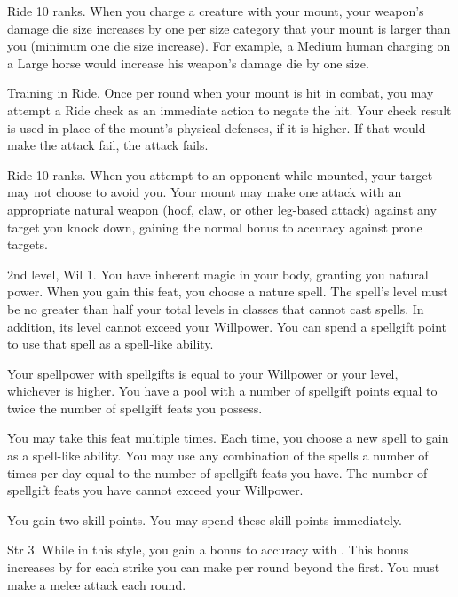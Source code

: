\featpre Ride 10 ranks.
\featben When you charge a creature with your mount, your weapon's damage die size increases by one per size category that your mount is larger than you (minimum one die size increase).
For example, a Medium human charging on a Large horse would increase his weapon's damage die by one size.

\featpre Training in Ride.
\featben Once per round when your mount is hit in combat, you may attempt a Ride check as an immediate action to negate the hit.
Your check result is used in place of the mount's physical defenses, if it is higher.
If that would make the attack fail, the attack fails.

\featpre Ride 10 ranks.
\featben When you attempt to  an opponent while mounted, your target may not choose to avoid you.
Your mount may make one attack with an appropriate natural weapon (hoof, claw, or other leg-based attack) against any target you knock down, gaining the normal  bonus to accuracy against prone targets.

\featpres 2nd level, Wil 1.
\featben You have inherent magic in your body, granting you natural power.
When you gain this feat, you choose a nature spell.
The spell's level must be no greater than half your total levels in classes that cannot cast spells.
In addition, its level cannot exceed your Willpower.
You can spend a spellgift point to use that spell as a spell-like ability.

Your spellpower with spellgifts is equal to your Willpower or your level, whichever is higher.
You have a pool with a number of spellgift points equal to twice the number of spellgift feats you possess.

You may take this feat multiple times.
Each time, you choose a new spell to gain as a spell-like ability.
You may use any combination of the spells a number of times per day equal to the number of spellgift feats you have.
The number of spellgift feats you have cannot exceed your Willpower.

\featben You gain two skill points.
You may spend these skill points immediately.

\featpre Str 3.
\featben While in this style, you gain a  bonus to accuracy with .
This bonus increases by  for each strike you can make per round beyond the first.
\stylereq You must make a melee attack each round.

